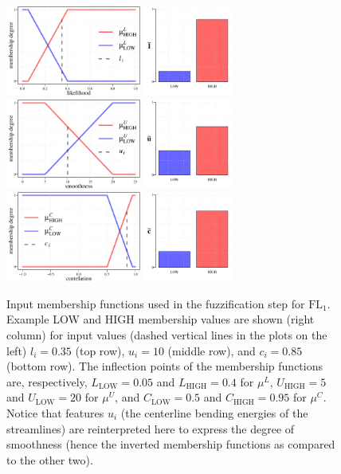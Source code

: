 \begin{figure}[!t]
	\centering
	\includegraphics[height=8em]{L_fuzzification_1}%
	\includegraphics[height=8em]{L_fuzzification_2} \\[2ex]
	\includegraphics[height=8em]{U_fuzzification_1}%
	\includegraphics[height=8em]{U_fuzzification_2} \\[2ex]
	\includegraphics[height=8em]{C_fuzzification_1}%
	\includegraphics[height=8em]{C_fuzzification_2} \\%
	\caption{Input membership functions used in the fuzzification step for $\textrm{FL}_{1}$. Example LOW and HIGH membership values are shown (right column) for input values (dashed vertical lines in the plots on the left) $l_{i}=0.35$ (top row), $u_{i}=10$ (middle row), and $c_{i}=0.85$ (bottom row). The inflection points of the membership functions are, respectively, $L_{\textrm{LOW}}=0.05$ and $L_{\textrm{HIGH}}=0.4$ for $\mu^{L}$, $U_{\textrm{HIGH}}=5$ and $U_{\textrm{LOW}}=20$ for $\mu^{U}$, and $C_{\textrm{LOW}}=0.5$ and $C_{\textrm{HIGH}}=0.95$ for $\mu^{C}$. Notice that features $u_{i}$ (the centerline bending energies of the streamlines) are reinterpreted here to express the degree of smoothness (hence the inverted membership functions as compared to the other two).}

\end{figure}
